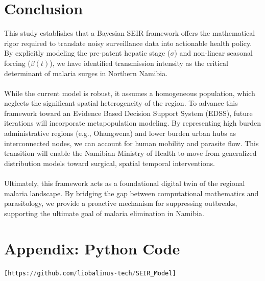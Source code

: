 \documentclass[12pt,a4paper]{report} %
\begin{document}
\section{Conclusion}
This study establishes that a Bayesian SEIR framework offers the mathematical rigor required to translate noisy surveillance data into actionable health policy. By explicitly modeling the pre-patent hepatic stage ($\sigma$) and non-linear seasonal forcing ($\beta(t)$), we have identified transmission intensity as the critical determinant of malaria surges in Northern Namibia.\\\\
While the current model is robust, it assumes a homogeneous population, which neglects the significant spatial heterogeneity of the region. To advance this framework toward an Evidence Based Decision Support System (EDSS), future iterations will incorporate metapopulation modeling. By representing high burden administrative regions (e.g., Ohangwena) and lower burden urban hubs as interconnected nodes, we can account for human mobility and parasite flow. This transition will enable the Namibian Ministry of Health to move from generalized distribution models toward surgical, spatial temporal interventions.\\\\
Ultimately, this framework acts as a foundational digital twin of the regional malaria landscape. By bridging the gap between computational mathematics and parasitology, we provide a proactive mechanism for suppressing outbreaks, supporting the ultimate goal of malaria elimination in Namibia.

\newpage

\newpage
\section*{Appendix: Python Code}
\begin{lstlisting}[language=Python]
[https://github.com/liobalinus-tech/SEIR_Model]
\end{lstlisting}
\end{document}
